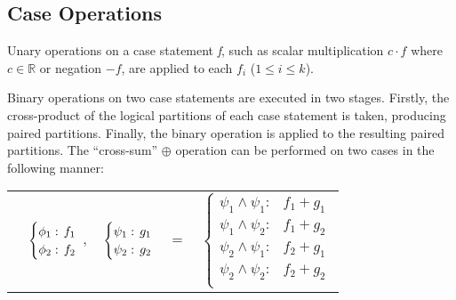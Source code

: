 \subsection{Case Operations}

Unary operations on a case statement \emph{f}, such as scalar 
multiplication $c \cdot f$ where $ c \in \mathbb{R} $ or negation $-f$,
are applied to each $f_i$ ($1 \leq i \leq k$). 

Binary operations on two case statements are executed in two stages.
Firstly, the cross-product of the logical partitions of each case statement 
is taken, producing paired partitions. Finally, the binary operation 
is applied to the resulting paired partitions. The ``cross-sum'' $\oplus$
operation can be performed on two cases in the following manner:

\begin{center}
  \begin{tabular}{r c c c l}
  &
    $\begin{cases}
        \phi_1: \hspace{-1mm} & \hspace{-1mm} f_1  \\ 
        \phi_2: \hspace{-1mm} & \hspace{-1mm} f_2  \\ 
    \end{cases}$
  $,$
  &
  \hspace{-4mm}
    $\begin{cases}
        \psi_1: \hspace{-1mm} & \hspace{-1mm} g_1  \\ 
        \psi_2: \hspace{-1mm} & \hspace{-1mm} g_2  \\ 
    \end{cases}$
  &
  \hspace{-4mm} 
  $ = $
  &
  \hspace{-4mm}
    $\begin{cases}
      \psi_1 \wedge \psi_1: & f_1 + g_1 \\
      \psi_1 \wedge \psi_2: & f_1 + g_2 \\
      \psi_2 \wedge \psi_1: & f_2 + g_1 \\
      \psi_2 \wedge \psi_2: & f_2 + g_2  \\
    \end{cases}$
  \end{tabular}
\end{center}

